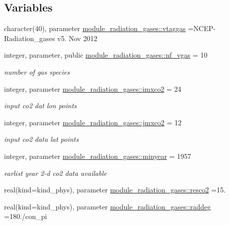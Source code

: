 \subsection*{Variables}
\begin{DoxyCompactItemize}
\item 
character(40), parameter \hyperlink{namespacemodule__radiation__gases_a8a79a6d3d931da021cd19290c58bdfaa}{module\+\_\+radiation\+\_\+gases\+::vtaggas} =\textquotesingle{}N\+C\+EP-\/Radiation\+\_\+gases v5. Nov 2012 \textquotesingle{}
\item 
integer, parameter, public \hyperlink{group__module__radiation__gases_gaffc350828412da77ff3cf3e617ddc66c}{module\+\_\+radiation\+\_\+gases\+::nf\+\_\+vgas} = 10
\begin{DoxyCompactList}\small\item\em number of gas species \end{DoxyCompactList}\item 
integer, parameter \hyperlink{group__module__radiation__gases_ga46eb4079ff9932819b3ab133bf6a43d9}{module\+\_\+radiation\+\_\+gases\+::imxco2} = 24
\begin{DoxyCompactList}\small\item\em input co2 dat lon points \end{DoxyCompactList}\item 
integer, parameter \hyperlink{group__module__radiation__gases_gaa56e209872093bfcbdaeb452f5e5e332}{module\+\_\+radiation\+\_\+gases\+::jmxco2} = 12
\begin{DoxyCompactList}\small\item\em input co2 data lat points \end{DoxyCompactList}\item 
integer, parameter \hyperlink{group__module__radiation__gases_ga3b26af64187b57999cadeced419b0f1b}{module\+\_\+radiation\+\_\+gases\+::minyear} = 1957
\begin{DoxyCompactList}\small\item\em earlist year 2-\/d co2 data available \end{DoxyCompactList}\item 
real(kind=kind\+\_\+phys), parameter \hyperlink{group__module__radiation__gases_gafda5c1d1129d865b9772e0f58dea7598}{module\+\_\+radiation\+\_\+gases\+::resco2} =15.
\item 
real(kind=kind\+\_\+phys), parameter \hyperlink{group__module__radiation__gases_gaa5873ae54e950001ff873771378e7a1e}{module\+\_\+radiation\+\_\+gases\+::raddeg} =180./con\+\_\+pi
\item 

\end{DoxyCompactItemize}
